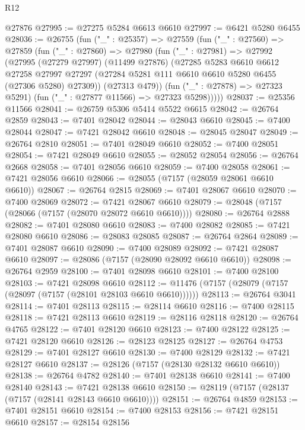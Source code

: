 \begin{lexlean}{R12}
\begin{coremodule}
    @27876
@27995 := @27275 @5284 @6613 @6610
@27997 := @6421 @5280 @6455
@28036 := @26755
    (fun ("_" : @25357) =>
    @27559
      (fun ("_" : @27560) =>
      @27859
        (fun ("_" : @27860) =>
        @27980
          (fun ("_" : @27981) =>
          @27992
            (@27995
              (@27279 @27997)
              (@11499 @27876)
              (@27285
                @5283
                @6610
                @6612
                @27258
                @27997
                @27297
                (@27284 @5281 @111 @6610 @6610 @5280 @6455 (@27306 @5280) @27309))
              (@27313 @479))
            (fun ("_" : @27878) => @27323 @5291)
            (fun ("_" : @27877 @11566) => @27323 @5298)))))
@28037 := @25356 @11566
@28041 := @26759 @5306 @5414 @5522 @6615
@28042 := @26764 @2859
@28043 := @7401 @28042
@28044 := @28043 @6610
@28045 := @7400 @28044
@28047 := @7421 @28042 @6610
@28048 := @28045 @28047
@28049 := @26764 @2810
@28051 := @7401 @28049 @6610
@28052 := @7400 @28051
@28054 := @7421 @28049 @6610
@28055 := @28052 @28054
@28056 := @26764 @2668
@28058 := @7401 @28056 @6610
@28059 := @7400 @28058
@28061 := @7421 @28056 @6610
@28066 := @28055 (@7157 (@28059 @28061 @6610 @6610))
@28067 := @26764 @2815
@28069 := @7401 @28067 @6610
@28070 := @7400 @28069
@28072 := @7421 @28067 @6610
@28079 := @28048 (@7157 (@28066 (@7157 (@28070 @28072 @6610 @6610))))
@28080 := @26764 @2888
@28082 := @7401 @28080 @6610
@28083 := @7400 @28082
@28085 := @7421 @28080 @6610
@28086 := @28083 @28085
@28087 := @26764 @2864
@28089 := @7401 @28087 @6610
@28090 := @7400 @28089
@28092 := @7421 @28087 @6610
@28097 := @28086 (@7157 (@28090 @28092 @6610 @6610))
@28098 := @26764 @2959
@28100 := @7401 @28098 @6610
@28101 := @7400 @28100
@28103 := @7421 @28098 @6610
@28112 := @11476 (@7157 (@28079 (@7157 (@28097 (@7157 (@28101 @28103 @6610 @6610))))))
@28113 := @26764 @3041
@28114 := @7401 @28113
@28115 := @28114 @6610
@28116 := @7400 @28115
@28118 := @7421 @28113 @6610
@28119 := @28116 @28118
@28120 := @26764 @4765
@28122 := @7401 @28120 @6610
@28123 := @7400 @28122
@28125 := @7421 @28120 @6610
@28126 := @28123 @28125
@28127 := @26764 @4753
@28129 := @7401 @28127 @6610
@28130 := @7400 @28129
@28132 := @7421 @28127 @6610
@28137 := @28126 (@7157 (@28130 @28132 @6610 @6610))
@28138 := @26764 @4782
@28140 := @7401 @28138 @6610
@28141 := @7400 @28140
@28143 := @7421 @28138 @6610
@28150 := @28119 (@7157 (@28137 (@7157 (@28141 @28143 @6610 @6610))))
@28151 := @26764 @4859
@28153 := @7401 @28151 @6610
@28154 := @7400 @28153
@28156 := @7421 @28151 @6610
@28157 := @28154 @28156

\end{coremodule}
\end{lexlean}
